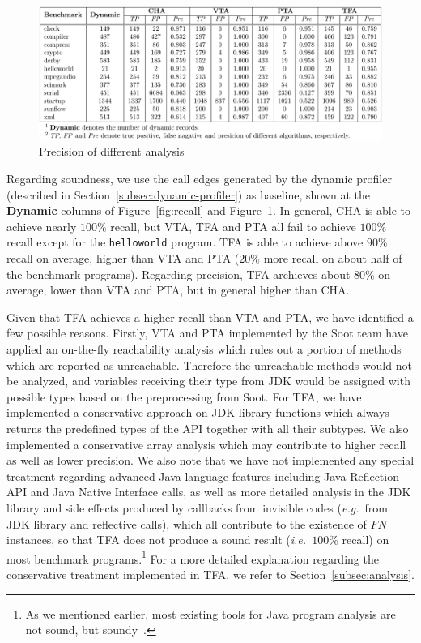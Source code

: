 \documentclass{fac}
\newcommand\eg{\textit{e.g.\ }}
\newcommand\ie{\textit{i.e.\ }}
\begin{document}
\begin{figure}\centering
\includegraphics[scale=0.9]{precision-lib.pdf}
\caption{Precision of different analysis}
\label{fig:precision}
\end{figure}


Regarding soundness, we use the call edges generated by the dynamic profiler (described in Section~\ref{subsec:dynamic-profiler}) as baseline, shown at the \textbf{Dynamic} columns of Figure~\ref{fig:recall} and Figure~\ref{fig:precision}. In general, CHA is able to achieve nearly $100\%$ recall, but VTA, TFA and PTA all fail to achieve $100\%$ recall except for the \texttt{helloworld} program. TFA is able to achieve above $90\%$ recall on average, higher than VTA and PTA ($20\%$ more recall on about half of the benchmark programs). Regarding precision, TFA archieves about $80\%$ on average, lower than VTA and PTA, but in general higher than CHA.

Given that TFA achieves a higher recall than VTA and PTA, we have identified a few possible reasons. Firstly, VTA and PTA implemented by the Soot team have applied an on-the-fly reachability analysis which rules out a portion of methods which are reported as unreachable. Therefore the unreachable methods would not be analyzed, and variables receiving their type from JDK would be assigned with possible types based on the preprocessing from Soot. For TFA, we have implemented a conservative approach on JDK library functions which always returns the predefined types of the API together with all their subtypes. We also implemented a conservative array analysis which may contribute to higher recall as well as lower precision. We also note that we have not implemented any special treatment regarding advanced Java language features including Java Reflection API and Java Native Interface calls, as well as more detailed analysis in the JDK library and side effects produced by callbacks from invisible codes (\eg from JDK library and reflective calls), which all contribute to the existence of $FN$ instances, so that TFA does not produce a sound result (\ie $100\%$ recall) on most benchmark programs.\footnote{As we mentioned earlier, most existing tools for Java program analysis are not sound, but soundy~\cite{LivshitsSSLACGKMV15}.}
For a more detailed explanation regarding the conservative treatment implemented in TFA, we refer to Section~\ref{subsec:analysis}.
\end{document}
